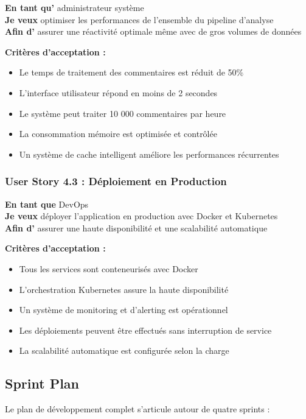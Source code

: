 \textbf{En tant qu'} administrateur système \\
\textbf{Je veux} optimiser les performances de l'ensemble du pipeline d'analyse \\
\textbf{Afin d'} assurer une réactivité optimale même avec de gros volumes de données

\textbf{Critères d'acceptation :}
\begin{itemize}
    \item Le temps de traitement des commentaires est réduit de 50\%
    \item L'interface utilisateur répond en moins de 2 secondes
    \item Le système peut traiter 10 000 commentaires par heure
    \item La consommation mémoire est optimisée et contrôlée
    \item Un système de cache intelligent améliore les performances récurrentes
\end{itemize}

\subsubsection{User Story 4.3 : Déploiement en Production}

\textbf{En tant que} DevOps \\
\textbf{Je veux} déployer l'application en production avec Docker et Kubernetes \\
\textbf{Afin d'} assurer une haute disponibilité et une scalabilité automatique

\textbf{Critères d'acceptation :}
\begin{itemize}
    \item Tous les services sont conteneurisés avec Docker
    \item L'orchestration Kubernetes assure la haute disponibilité
    \item Un système de monitoring et d'alerting est opérationnel
    \item Les déploiements peuvent être effectués sans interruption de service
    \item La scalabilité automatique est configurée selon la charge
\end{itemize}

\subsection{Sprint Plan}

Le plan de développement complet s'articule autour de quatre sprints :

